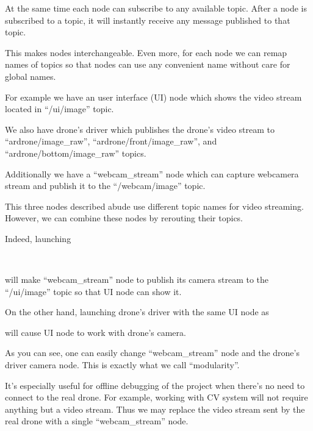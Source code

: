 \documentclass[11pt]{article}
\begin{document}
    At the same time each node can subscribe to any available topic.
    After a node is subscribed to a topic, it will instantly receive
    any message published to that topic.

    This makes nodes interchangeable. Even more, for each node we can remap
    names of topics so that nodes can use any convenient name without care
    for global names.

    For example we have an user interface (UI) node which shows the video
    stream located in ``/ui/image'' topic.

    We also have drone's driver which publishes the drone's video stream to\\
    ``ardrone/image\_raw'', ``ardrone/front/image\_raw'',
    and ``ardrone/bottom/image\_raw'' topics.

    Additionally we have a ``webcam\_stream'' node which
    can capture webcamera stream
    and publish it to the ``/webcam/image'' topic.

    This three nodes described abude use different topic names for video
    streaming. However, we can combine these nodes by rerouting their topics.

    Indeed, launching

    \\

    will make ``webcam\_stream'' node to publish its camera stream to the
    ``/ui/image'' topic so that UI node can show it.

    On the other hand, launching drone's driver
    with the same UI node as


    will cause UI node to work with drone's camera.

    As you can see, one can easily change ``webcam\_stream'' node and the
    drone's driver camera node. This is exactly what we call ``modularity''.

    It's especially useful for offline debugging of the project when there's
    no need to connect to the real drone.
    For example, working with CV system will not require anything but a
    video stream. Thus we may replace the video stream sent by the real drone
    with a single ``webcam\_stream'' node.
\end{document}
